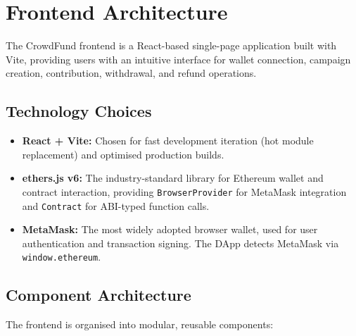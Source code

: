 \section{Frontend Architecture}
\label{sec:frontend}

The CrowdFund frontend is a React-based single-page application built with Vite, providing users with an intuitive interface for wallet connection, campaign creation, contribution, withdrawal, and refund operations.

\subsection{Technology Choices}

\begin{itemize}[leftmargin=1.5em]
    \item \textbf{React + Vite:} Chosen for fast development iteration (hot module replacement) and optimised production builds.
    \item \textbf{ethers.js v6:} The industry-standard library for Ethereum wallet and contract interaction, providing \texttt{BrowserProvider} for MetaMask integration and \texttt{Contract} for ABI-typed function calls.
    \item \textbf{MetaMask:} The most widely adopted browser wallet, used for user authentication and transaction signing. The DApp detects MetaMask via \texttt{window.ethereum}.
\end{itemize}

\subsection{Component Architecture}

The frontend is organised into modular, reusable components:

